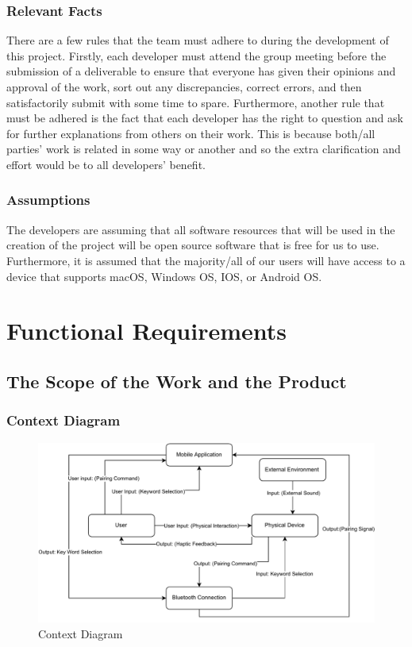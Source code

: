 \documentclass[12pt]{article}
\begin{document}
\subsubsection{Relevant Facts}
There are a few rules that the team must adhere to during the development of this
project. Firstly, each developer must attend the group meeting before the submission
of a deliverable to ensure that everyone has given their opinions and approval of the
work, sort out any discrepancies, correct errors, and then satisfactorily submit with
some time to spare. Furthermore, another rule that must be adhered is the fact that 
each developer has the right to question and ask for further explanations from others 
on their work. This is because both/all parties' work is related in some way or another 
and so the extra clarification and effort would be to all developers' benefit. 

\subsubsection{Assumptions}
The developers are assuming that all software resources that will be used in the 
creation of the project will be open source software that is free for us to use. 
Furthermore, it is assumed that the majority/all of our users will have access to 
a device that supports macOS, Windows OS, IOS, or Android OS.

\section{Functional Requirements}
\subsection{The Scope of the Work and the Product}
\subsubsection{Context Diagram}

\begin{figure}[H]
  \begin{center}
    \includegraphics{WC.pdf}
  \caption{Context Diagram}
  \label{ContextDiagram} 
  \end{center}
\end{figure}
\end{document}

